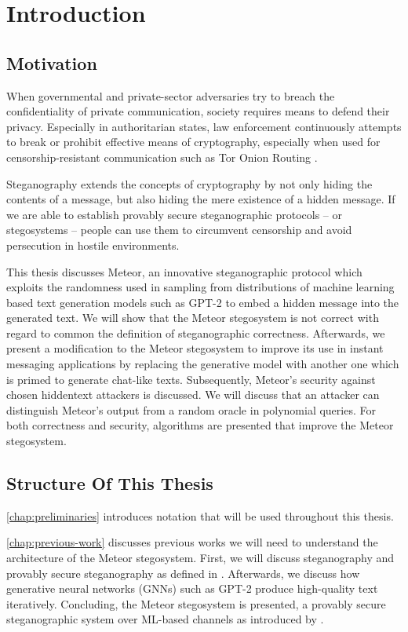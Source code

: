 \chapter{Introduction}

\section{Motivation}

When governmental and private-sector adversaries try to breach the confidentiality of private communication, society requires means to defend their privacy.
Especially in authoritarian states, law enforcement continuously attempts to break or prohibit effective means of cryptography, especially when used for censorship-resistant communication such as Tor Onion Routing \cite{Tor2004}.

Steganography extends the concepts of cryptography by not only hiding the contents of a message, but also hiding the mere existence of a hidden message.
If we are able to establish provably secure steganographic protocols -- or stegosystems -- people can use them to circumvent censorship and avoid persecution in hostile environments.

This thesis discusses Meteor, an innovative steganographic protocol which exploits the randomness used in sampling from distributions of machine learning based text generation models such as GPT-2 to embed a hidden message into the generated text.
We will show that the Meteor stegosystem is not correct with regard to common the definition of steganographic correctness.
Afterwards, we present a modification to the Meteor stegosystem to improve its use in instant messaging applications by replacing the generative model with another one which is primed to generate chat-like texts.
Subsequently, Meteor's security against chosen hiddentext attackers is discussed.
We will discuss that an attacker can distinguish Meteor's output from a random oracle in polynomial queries.
For both correctness and security, algorithms are presented that improve the Meteor stegosystem.



\section{Structure Of This Thesis}

\autoref{chap:preliminaries} introduces notation that will be used throughout this thesis.

\autoref{chap:previous-work} discusses previous works we will need to understand the architecture of the Meteor stegosystem.
First, we will discuss steganography and provably secure steganography as defined in \cite{Hopper2004}.
Afterwards, we discuss how generative neural networks (GNNs) such as GPT-2 produce high-quality text iteratively.
Concluding, the Meteor stegosystem is presented, a provably secure steganographic system over ML-based channels as introduced by \cite{Meteor2021}.

